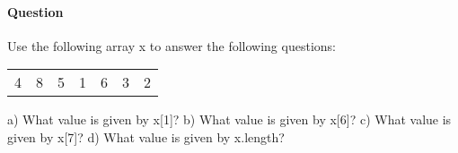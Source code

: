 \documentclass{article}
\begin{document}
\addtocounter{question_num}{1}
\paragraph{Question }
Use the following array x to answer the following questions:
\begin{table}[h]
\begin{tabular}{lllllll}
4 & 8 & 5 & 1 & 6 & 3 & 2
\end{tabular}
\end{table}
\newline
a) What value is given by x[1]?
\newline b) What value is given by x[6]?
\newline c) What value is given by x[7]?
\newline d) What value is given by x.length?
\end{document}

